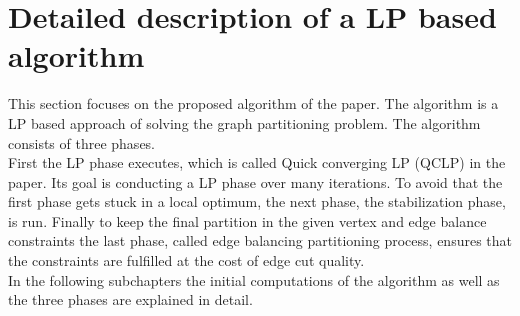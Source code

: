 \documentclass[acmsmall,nonacm,screen,review]{acmart}
\begin{document}
\section{Detailed description of a LP based algorithm}
This section focuses on the proposed algorithm of the paper. The algorithm is a LP based approach of solving the graph partitioning problem. The algorithm consists of three phases.\\
First the LP phase executes, which is called Quick converging LP (QCLP) in the paper. Its goal is conducting a LP phase over many iterations. To avoid that the first phase gets stuck in a local optimum, the next phase, the stabilization phase, is run. Finally to keep the final partition in the given vertex and edge balance constraints the last phase, called edge balancing partitioning process, ensures that the constraints are fulfilled at the cost of edge cut quality.\\
In the following subchapters the initial computations of the algorithm as well as the three phases are explained in detail.
\end{document}
